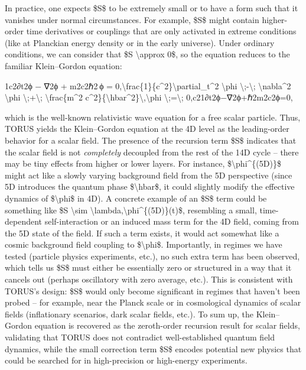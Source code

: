 \documentclass[]{article}
\begin{document}
In practice, one expects \$S\$ to be extremely small or to have a form
such that it vanishes under normal circumstances. For example, \$S\$
might contain higher-order time derivatives or couplings that are only
activated in extreme conditions (like at Planckian energy density or in
the early universe). Under ordinary conditions, we can consider that \$S
\textbackslash{}approx 0\$, so the equation reduces to the familiar
Klein--Gordon equation:

1c2∂t2ϕ  −  ∇2ϕ  +  m2c2ℏ2 ϕ  =  0,\textbackslash{}frac\{1\}\{c\^{}2\}\textbackslash{}partial\_t\^{}2
\textbackslash{}phi \textbackslash{};-\textbackslash{};
\textbackslash{}nabla\^{}2 \textbackslash{}phi
\textbackslash{};+\textbackslash{}; \textbackslash{}frac\{m\^{}2
c\^{}2\}\{\textbackslash{}hbar\^{}2\}\textbackslash{},\textbackslash{}phi
\textbackslash{};=\textbackslash{}; 0,c21​∂t2​ϕ−∇2ϕ+ℏ2m2c2​ϕ=0,

which is the well-known relativistic wave equation for a free scalar
particle. Thus, TORUS yields the Klein--Gordon equation at the 4D level
as the leading-order behavior for a scalar field. The presence of the
recursion term \$S\$ indicates that the scalar field is not
\emph{completely} decoupled from the rest of the 14D cycle -- there may
be tiny effects from higher or lower layers. For instance,
\$\textbackslash{}phi\^{}\{(5D)\}\$ might act like a slowly varying
background field from the 5D perspective (since 5D introduces the
quantum phase \$\textbackslash{}hbar\$, it could slightly modify the
effective dynamics of \$\textbackslash{}phi\$ in 4D). A concrete example
of an \$S\$ term could be something like \$S \textbackslash{}sim
\textbackslash{}lambda,\textbackslash{}phi\^{}\{(5D)\}(t)\$, resembling
a small, time-dependent self-interaction or an induced mass term for the
4D field, coming from the 5D state of the field. If such a term exists,
it would act somewhat like a cosmic background field coupling to
\$\textbackslash{}phi\$. Importantly, in regimes we have tested
(particle physics experiments, etc.), no such extra term has been
observed, which tells us \$S\$ must either be essentially zero or
structured in a way that it cancels out (perhaps oscillatory with zero
average, etc.). This is consistent with TORUS's design: \$S\$ would only
become significant in regimes that haven't been probed -- for example,
near the Planck scale or in cosmological dynamics of scalar fields
(inflationary scenarios, dark scalar fields, etc.). To sum up, the
Klein--Gordon equation is recovered as the zeroth-order recursion result
for scalar fields, validating that TORUS does not contradict
well-established quantum field dynamics, while the small correction term
\$S\$ encodes potential new physics that could be searched for in
high-precision or high-energy experiments.
\end{document}

